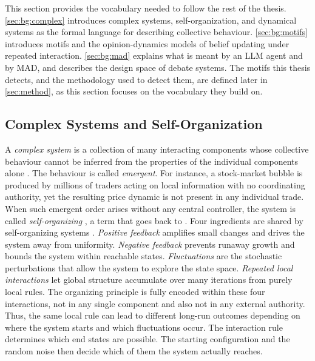 This section provides the vocabulary needed to follow the rest of
the thesis. \autoref{sec:bg:complex} introduces complex systems,
self-organization, and dynamical systems as the formal language for describing
collective behaviour.
\autoref{sec:bg:motifs} introduces motifs and the opinion-dynamics models of
belief updating under repeated interaction. \autoref{sec:bg:mad} explains what is
meant by an \ac{LLM} agent and by \ac{MAD}, and describes the design space
of debate systems. The motifs this thesis detects, and the
methodology used to detect them, are defined later in \autoref{sec:method},
as this section focuses on the vocabulary they build on.

\subsection{Complex Systems and Self-Organization}
\label{sec:bg:complex}

A \emph{complex system} is a collection of many interacting components whose
collective behaviour cannot be inferred from the properties of the individual
components alone \citep{anderson1972more, mitchell2009complexity}. The behaviour is
called \emph{emergent}. For instance, a stock-market bubble is produced by
millions of traders acting on local information with no coordinating
authority, yet the resulting price dynamic is not present in any individual
trade. When such emergent order arises without
any central controller, the system is called \emph{self-organizing}
\citep{camazine2001self}, a term that goes back to \citet{ashby1947principles}. Four ingredients are shared by
self-organizing systems \citep{camazine2001self}. \emph{Positive feedback}
amplifies small changes and drives the system away from uniformity.
\emph{Negative feedback} prevents runaway growth and bounds the system within
reachable states. \emph{Fluctuations} are the stochastic perturbations that
allow the system to explore the state space. \emph{Repeated local
interactions} let global structure accumulate over many iterations from purely
local rules. The organizing
principle is fully encoded within these four interactions, not in any single
component and also not in any external authority. Thus, the same local rule can 
lead to different long-run outcomes depending on where the system
starts and which fluctuations occur. The interaction rule determines
which end states are possible. The starting configuration and the random noise
then decide which of them the system actually reaches.

